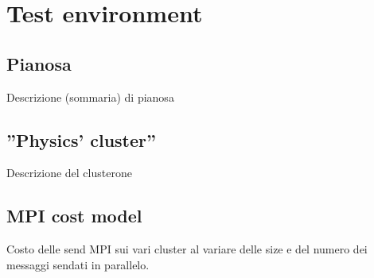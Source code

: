 \section{Test environment}
\subsection{Pianosa}
Descrizione (sommaria) di pianosa
\subsection{''Physics' cluster''}
Descrizione del clusterone
\subsection{MPI cost model}
Costo delle send MPI sui vari cluster al variare delle size e del numero dei messaggi sendati in parallelo.